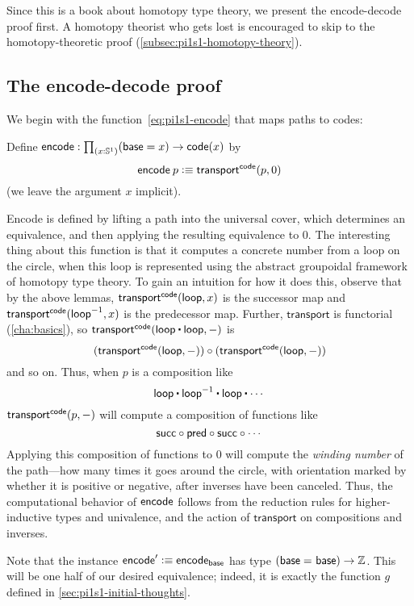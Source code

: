 Since this is a book about homotopy type theory, we present the encode-decode proof first.
A homotopy theorist who gets lost is encouraged to skip to the homotopy-theoretic proof (\autoref{subsec:pi1s1-homotopy-theory}).

%
%
%

\subsection{The encode-decode proof}
\label{subsec:pi1s1-encode-decode}

%
We begin with the function~\eqref{eq:pi1s1-encode} that maps paths to codes:
\begin{defn}
Define $\encode : \prd{x : \Sn ^1} (\base=x) \rightarrow  \code(x)$ by 
\[
\mathsf{encode} \: p \vcentcolon\equiv \mathsf{transport}^{\mathsf{code}}(p,0)
\]
(we leave the argument $x$ implicit).  
\end{defn}
Encode is defined by lifting a path into the universal cover, which
determines an equivalence, and then applying the resulting equivalence
to $0$.  
The interesting thing about this function is that it computes a concrete
number from a loop on the circle, when this loop is represented using
the abstract groupoidal framework of homotopy type theory.  To gain an
intuition for how it does this, observe that by the above lemmas,
$\mathsf{transport}^{\mathsf{code}}(\mathsf{loop},x)$ is the successor map and $\mathsf{transport}^{\mathsf{code}}(\mathord{{\mathsf{loop}}^{-1}},x)$ is the predecessor map.
Further, $\mathsf{transport}$ is functorial (\autoref{cha:basics}), so
$\transfib{\code} {\lloop \ct \lloop}{-}$ is
\[(\mathsf{transport}^{\mathsf{code}}(\mathsf{loop},-)) \circ (\mathsf{transport}^{\mathsf{code}}(\mathsf{loop},-))\]
and so on.
Thus, when $p$ is a composition like 
\[
\lloop \ct \opp \lloop \ct \lloop \ct \cdots
\]
$\mathsf{transport}^{\mathsf{code}}(p,-)$ will compute a composition of functions like
\[
\mathsf{succ} \circ \mathsf{pred} \circ \mathsf{succ} \circ \cdots 
\]
Applying this composition of functions to 0 will compute the
%
\emph{winding number} of the path---how many times it goes around the
circle, with orientation marked by whether it is positive or negative,
after inverses have been canceled.  Thus, the computational behavior of
$\mathsf{encode}$ follows from the reduction rules for higher-inductive types and
univalence, and the action of $\mathsf{transport}$ on compositions and inverses.

Note that the instance $\mathsf{encode}' \vcentcolon\equiv \mathsf{encode}_{\mathsf{base}}$ has type 
$(\mathsf{base} =_{} \mathsf{base}) \rightarrow \mathbb{Z}$.
This will be one half of our desired equivalence; indeed, it is exactly the function $g$ defined in \autoref{sec:pi1s1-initial-thoughts}.

